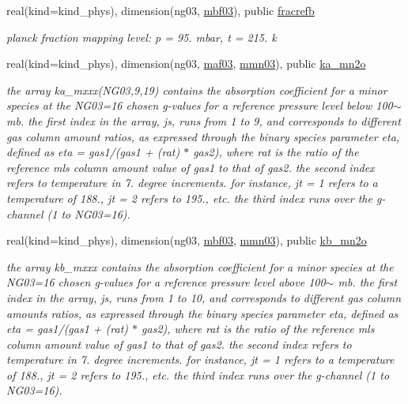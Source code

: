 \begin{DoxyCompactItemize}
real(kind=kind\+\_\+phys), dimension(ng03, \hyperlink{group__module__radlw__kgbnn_ga655fff8711d78d62ae9d4fa27d02621a}{mbf03}), public \hyperlink{group__module__radlw__kgbnn_gaf1d33a7362e73bf40ef592bc9863b612}{fracrefb}
\begin{DoxyCompactList}\small\item\em planck fraction mapping level\+: p = 95. mbar, t = 215. k \end{DoxyCompactList}\item 
real(kind=kind\+\_\+phys), dimension(ng03, \hyperlink{group__module__radlw__kgbnn_ga90d1081db011f0682cb4a83c40c5bb23}{maf03}, \hyperlink{group__module__radlw__kgbnn_gab4e84b10460930267256c0e5a1fe7a55}{mmn03}), public \hyperlink{group__module__radlw__kgbnn_gaeeba4e0a8fc97c557e1127b4d5d1bd94}{ka\+\_\+mn2o}
\begin{DoxyCompactList}\small\item\em the array ka\+\_\+mxxx(\+N\+G03,9,19) contains the absorption coefficient for a minor species at the N\+G03=16 chosen g-\/values for a reference pressure level below 100$\sim$ mb. the first index in the array, js, runs from 1 to 9, and corresponds to different gas column amount ratios, as expressed through the binary species parameter eta, defined as eta = gas1/(gas1 + (rat) $\ast$ gas2), where rat is the ratio of the reference mls column amount value of gas1 to that of gas2. the second index refers to temperature in 7. degree increments. for instance, jt = 1 refers to a temperature of 188., jt = 2 refers to 195., etc. the third index runs over the g-\/channel (1 to N\+G03=16). \end{DoxyCompactList}\item 
real(kind=kind\+\_\+phys), dimension(ng03, \hyperlink{group__module__radlw__kgbnn_ga655fff8711d78d62ae9d4fa27d02621a}{mbf03}, \hyperlink{group__module__radlw__kgbnn_gab4e84b10460930267256c0e5a1fe7a55}{mmn03}), public \hyperlink{group__module__radlw__kgbnn_gaa2442e663e83b222648a86a34cd6631c}{kb\+\_\+mn2o}
\begin{DoxyCompactList}\small\item\em the array kb\+\_\+mxxx contains the absorption coefficient for a minor species at the N\+G03=16 chosen g-\/values for a reference pressure level above 100$\sim$ mb. the first index in the array, js, runs from 1 to 10, and corresponds to different gas column amounts ratios, as expressed through the binary species parameter eta, defined as eta = gas1/(gas1 + (rat) $\ast$ gas2), where rat is the ratio of the reference mls column amount value of gas1 to that of gas2. the second index refers to temperature in 7. degree increments. for instance, jt = 1 refers to a temperature of 188., jt = 2 refers to 195., etc. the third index runs over the g-\/channel (1 to N\+G03=16). \end{DoxyCompactList}\end{DoxyCompactItemize}
